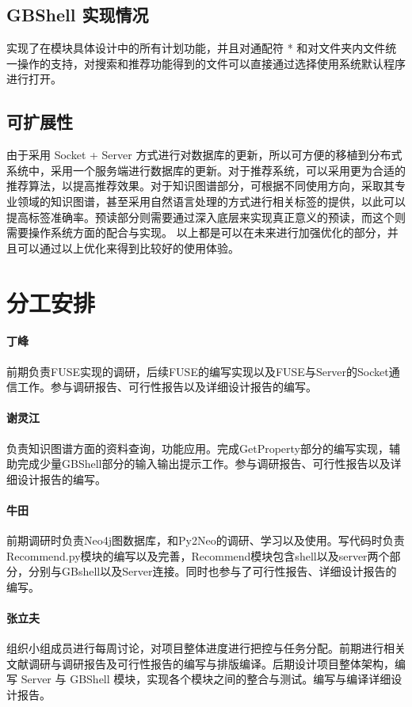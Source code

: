 \documentclass[UTF8]{ctexart}
\begin{document}
\subsection{GBShell 实现情况}
实现了在模块具体设计中的所有计划功能，并且对通配符 * 和对文件夹内文件统一操作的支持，对搜索和推荐功能得到的文件可以直接通过选择使用系统默认程序进行打开。

\subsection{可扩展性}
由于采用 Socket + Server 方式进行对数据库的更新，所以可方便的移植到分布式系统中，采用一个服务端进行数据库的更新。对于推荐系统，可以采用更为合适的推荐算法，以提高推荐效果。对于知识图谱部分，可根据不同使用方向，采取其专业领域的知识图谱，甚至采用自然语言处理的方式进行相关标签的提供，以此可以提高标签准确率。预读部分则需要通过深入底层来实现真正意义的预读，而这个则需要操作系统方面的配合与实现。
以上都是可以在未来进行加强优化的部分，并且可以通过以上优化来得到比较好的使用体验。

\section{分工安排}
\paragraph{丁峰} 前期负责FUSE实现的调研，后续FUSE的编写实现以及FUSE与Server的Socket通信工作。参与调研报告、可行性报告以及详细设计报告的编写。

\paragraph{谢灵江} 负责知识图谱方面的资料查询，功能应用。完成GetProperty部分的编写实现，辅助完成少量GBShell部分的输入输出提示工作。参与调研报告、可行性报告以及详细设计报告的编写。

\paragraph{牛田} 前期调研时负责Neo4j图数据库，和Py2Neo的调研、学习以及使用。写代码时负责Recommend.py模块的编写以及完善，Recommend模块包含shell以及server两个部分，分别与GBshell以及Server连接。同时也参与了可行性报告、详细设计报告的编写。

\paragraph{张立夫}组织小组成员进行每周讨论，对项目整体进度进行把控与任务分配。前期进行相关文献调研与调研报告及可行性报告的编写与排版编译。后期设计项目整体架构，编写 Server 与 GBShell 模块，实现各个模块之间的整合与测试。编写与编译详细设计报告。
\end{document}
